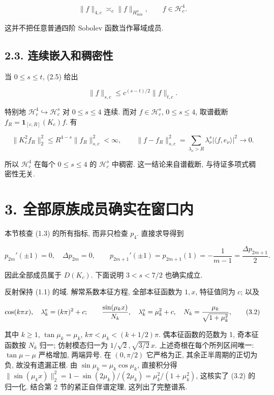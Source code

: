 \documentclass[UTF8,fontset=fandol,11pt,a4paper]{ctexart}
\begin{document}
\[
 \|f\|_{4,c}\asymp_c\|f\|_{H_{\mathrm{Sob}}^4},
 \qquad f\in\mathcal H_c^4.
 \tag{2.9}
\]


这并不把任意普通四阶 Sobolev 函数当作幂域成员.


\subsection*{2.3. 连续嵌入和稠密性}

当 \(0\le s\le t\), (2.5) 给出


\[
 \|f\|_{s,c}\le c^{(s-t)/2}\|f\|_{t,c}.
 \tag{2.10}
\]


特别地 \(\mathcal H_c^4\hookrightarrow\mathcal H_c^s\) 对 \(0\le s\le4\) 连续. 而对 \(f\in\mathcal H_c^s\), \(0\le s\le4\), 取谱截断 \(f_R=\mathbf1_{[c,R]}(K_c)f\). 有


\[
 \|K_c^2 f_R\|_2^2
 \le R^{4-s}\|f_R\|_{s,c}^2<\infty,\qquad
 \|f-f_R\|_{s,c}^2
 =\sum_{\lambda_\nu>R}\lambda_\nu^s|\langle f,e_\nu\rangle|^2\to0.
 \tag{2.11}
\]


所以 \(\mathcal H_c^4\) 在每个 \(0\le s\le4\) 的 \(\mathcal H_c^s\) 中稠密. 这一结论来自谱截断, 与待证多项式稠密性无关.


\section*{3. 全部原族成员确实在窗口内}

本节核查 (1.3) 的所有指标, 而非只检查 \(p_4\). 直接求导得到


\[
 p_{2m}'(\pm1)=0,\quad \Delta p_{2m}=0,\qquad
 p_{2m+1}'(\pm1)=p_{2m+1}(1)=-\frac1{m-1}
 =\frac{\Delta p_{2m+1}}2.
 \tag{3.1}
\]


因此全部成员属于 \(D(K_c)\). 下面说明 \(3<s<7/2\) 也确实成立.


反射保持 (1.1) 的域. 解常系数本征方程, 全部本征函数为 \(1,x\), 特征值同为 \(c\); 以及


\[
 \cos(k\pi x),\quad \lambda_k^{\rm e}=(k\pi)^2+c;\qquad
 \frac{\sin(\mu_kx)}{N_k},\quad \lambda_k^{\rm o}=\mu_k^2+c,
 \quad
 N_k=\frac{\mu_k}{\sqrt{1+\mu_k^2}},
 \tag{3.2}
\]


其中 \(k\ge1\), \(\tan\mu_k=\mu_k\), \(k\pi<\mu_k<(k+1/2)\pi\). 偶本征函数的范数为 1, 奇本征函数按 \(N_k\) 归一; 仿射模态归一为 \(1/\sqrt2,\sqrt{3/2}\,x\). 上述奇根在每个所列区间唯一: \(\tan\mu-\mu\) 严格增加, 两端异号. 在 \((0,\pi/2)\) 它严格为正, 其余正半周期的正切为负, 故没有遗漏正根. 由 \(\sin\mu_k=\mu_k\cos\mu_k\), 直接积分得 \(\|\sin(\mu_kx)\|_2^2=1-\sin(2\mu_k)/(2\mu_k)=\mu_k^2/(1+\mu_k^2)\), 这核实了 (3.2) 的归一化. 结合第 2 节的紧正自伴谱定理, 这列出了完整谱系.
\end{document}
